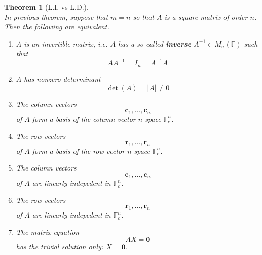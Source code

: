 \documentclass[12pt]{article}
\newtheorem{theorem}{Theorem}[section]
\theoremstyle{definition}
\begin{document}
\begin{theorem}[L.I. vs L.D.]
\hfill\\\normalfont In previous theorem, suppose that $m=n$ so that $A$ is a square matrix of order $n$. Then the following are equivalent.
\begin{enumerate}[label=(\arabic*)]
\item $A$ is an invertible matrix, i.e. $A$ has a so called \textbf{inverse} $A^{-1}\in M_n(\mathbb{F})$ such that
\[
AA^{-1}=I_n=A^{-1}A
\]
\item $A$ has nonzero determinant
\[
\det(A) = |A|\neq 0
\]
\item The column vectors
\[
\mathbf{c}_1,\ldots,\mathbf{c}_n
\]
of $A$ form a basis of the column vector $n$-space $\mathbb{F}_c^n$.
\item The row vectors
\[
\mathbf{r}_1,\ldots,\mathbf{r}_n
\]
of $A$ form a basis of the row vector $n$-space $\mathbb{F}_c^n$.
\item The column vectors
\[
\mathbf{c}_1,\ldots,\mathbf{c}_n
\]
of $A$ are linearly indepedent in $\mathbb{F}_c^n$.
\item The row vectors
\[
\mathbf{r}_1,\ldots,\mathbf{r}_n
\]
of $A$ are linearly indepedent in $\mathbb{F}_c^n$.
\item The matrix equation 
\[
AX=\mathbf{0}
\]
has the trivial solution only: $X=\mathbf{0}$.
\end{enumerate}
\end{theorem}
\end{document}

